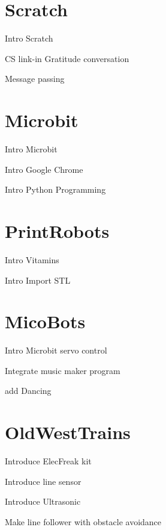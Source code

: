 \documentclass{article}
\def\FourthGradeFour{Scratch}
\def\FourthGradeFive{Microbit}
\def\FourthGradeSix{PrintRobots}
\def\FourthGradeSeven{MicoBots}
\def\FourthGradeEight{OldWestTrains}
\begin{document}
	\section{\FourthGradeFour}
	\begin{todolist}
		\item Intro Scratch
		\item CS link-in Gratitude conversation
		\item Message passing
	\end{todolist}

\section{\FourthGradeFive}
\begin{todolist}
	\item Intro Microbit
	\item Intro Google Chrome
	\item Intro Python Programming
\end{todolist}
\section{\FourthGradeSix}
\begin{todolist}
	\item Intro Vitamins
	\item Intro Import STL
\end{todolist}
\section{\FourthGradeSeven}
\begin{todolist}
	\item Intro Microbit servo control
	\item Integrate music maker program
	\item add Dancing
\end{todolist}
\section{\FourthGradeEight}
\begin{todolist}
	\item Introduce ElecFreak kit
	\item Introduce line sensor
	\item Introduce Ultrasonic
	\item Make line follower with obstacle avoidance
\end{todolist}
\newpage
\end{document}
